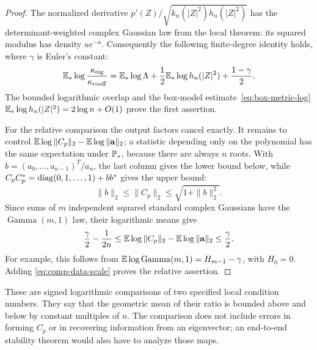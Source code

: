 \begin{proof}
The normalized derivative
$p'(Z)/\sqrt{k_n(|Z|^2)h_n(|Z|^2)}$ has the determinant-weighted
complex Gaussian law from the local theorem: its squared modulus has
density $u e^{-u}$.  Consequently the following finite-degree identity
holds, where $\gamma$ is Euler's constant:
\begin{equation}\label{eq:comp-absolute-identity}
  \mathbb E_*\log\frac{\kappa_{\mathrm{eig}}}{\kappa_{\mathrm{coeff}}}
  =\mathbb E_*\log\Lambda
    +\frac12\mathbb E_*\log h_n(|Z|^2)+\frac{1-\gamma}{2}.
\end{equation}
The bounded logarithmic overlap and the box-model estimate~\eqref{eq:box-metric-log}
$\mathbb E_*\log h_n(|Z|^2)=2\log n+O(1)$ prove the first assertion.

For the relative comparison the output factors cancel exactly.  It
remains to control
$\mathbb E\log\|C_p\|_2-\mathbb E\log\|\mathbf a\|_2$; a statistic depending only
on the polynomial has the same expectation under $\mathbb P_*$, because
there are always $n$ roots.  With
$b=(a_0,\ldots,a_{n-1})^T/a_n$, the last column gives the lower bound
below, while $C_pC_p^*=\operatorname{diag}(0,1,\ldots,1)+bb^*$ gives the upper bound:
\[
  \|b\|_2\le\|C_p\|_2\le\sqrt{1+\|b\|_2^2}.
\]
Since sums of $m$ independent squared standard complex Gaussians have
the $\operatorname{Gamma}(m,1)$ law, their logarithmic means give
\begin{equation}\label{eq:comp-data-scale}
  \frac\gamma2-\frac1{2n}
  \le \mathbb E\log\|C_p\|_2-\mathbb E\log\|\mathbf a\|_2
  \le\frac\gamma2.
\end{equation}
For example, this follows from
$\mathbb E\log\operatorname{Gamma}(m,1)=H_{m-1}-\gamma$, with $H_0=0$.
Adding \eqref{eq:comp-data-scale} proves the relative assertion.
\end{proof}

These are signed logarithmic comparisons of two specified local
condition numbers.  They say that the geometric mean of their ratio is
bounded above and below by constant multiples of $n$.  The comparison
does not include errors in forming $C_p$ or in recovering information
from an eigenvector; an end-to-end stability theorem would also have to
analyze those maps.
